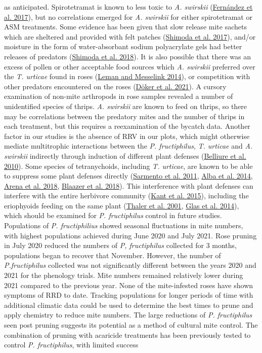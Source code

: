 \documentclass{ufdissertation}[overrideChapters] %
\begin{document}
{as anticipated. Spirotetramat is known to less toxic to \emph{A. swirskii} (\protect\hyperlink{ref-Fernandez2017}{Fernández et al. 2017}), but no correlations emerged for \emph{A. swirskii} for either spirotetramat or ASM treatments. Some evidence has been given that slow release mite sachets which are sheltered and provided with felt patches (\protect\hyperlink{ref-Shimoda2017}{Shimoda et al. 2017}), and/or moisture in the form of water-absorbant sodium polyacrylate gels had better releases of predators (\protect\hyperlink{ref-Shimoda2018}{Shimoda et al. 2018}). It is also possible that there was an excess of pollen or other acceptable food sources which \emph{A. swirskii} preferred over the \emph{T. urticae} found in roses (\protect\hyperlink{ref-Leman2014}{Leman and Messelink 2014}), or competition with other predators encountered on the roses (\protect\hyperlink{ref-Doeker2021}{Döker et al. 2021}). A cursory examination of non-mite arthropods in rose samples revealed a number of unidentified species of thrips. \emph{A. swirskii} are known to feed on thrips, so there may be correlations between the predatory mites and the number of thrips in each treatment, but this requires a reexamination of the bycatch data. Another factor in our studies is the absence of RRV in our plots, which might otherwise mediate multitrophic interactions between the \emph{P. fructiphilus}, \emph{T. urticae} and \emph{A. swirskii} indirectly through induction of different plant defenses (\protect\hyperlink{ref-Belliure2010}{Belliure et al. 2010}). Some species of tetranychoids, including \emph{T. urticae}, are known to be able to suppress some plant defenses directly (\protect\hyperlink{ref-Sarmento2011}{Sarmento et al. 2011}, \protect\hyperlink{ref-Alba2014}{Alba et al. 2014}, \protect\hyperlink{ref-Arena2018}{Arena et al. 2018}, \protect\hyperlink{ref-Blaazer2018}{Blaazer et al. 2018}). This interference with plant defenses can interfere with the entire herbivore community (\protect\hyperlink{ref-Kant2015}{Kant et al. 2015}), including the eriophyoids feeding on the same plant (\protect\hyperlink{ref-Thaler2001}{Thaler et al. 2001}, \protect\hyperlink{ref-Glas2014}{Glas et al. 2014}), which should be examined for \emph{P. fructiphilus} control in future studies. Populations of \emph{P. fructiphilius} showed seasonal fluctuations in mite numbers, with highest populations achieved during June 2020 and July 2021. Rose pruning in July 2020 reduced the numbers of \emph{P, fructiphilus} collected for 3 months, populations began to recover that November. However, the number of \emph{P.fructiphilus} collected was not significantly different between the years 2020 and 2021 for the phenology trials. Mite numbers remained relatively lower during 2021 compared to the previous year. None of the mite-infested roses have shown symptoms of RRD to date. Tracking populations for longer periods of time with additional climatic data could be used to determine the best times to prune and apply chemistry to reduce mite numbers. The large reductions of \emph{P. fructiphilus} seen post pruning suggests its potential as a method of cultural mite control. The combination of pruning with acaricide treatments has been previously tested to control \emph{P. fructiphilus}, with limited success }
\end{document}
